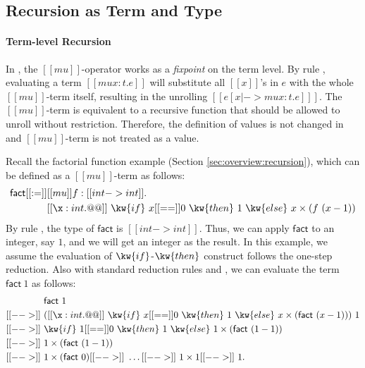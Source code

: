 \subsection{Recursion as Term and Type}
\label{subsec:recur}
\paragraph{Term-level Recursion}

In \name, the $[[mu]]$-operator works as a \emph{fixpoint} on the term
level. By rule , evaluating a term $[[mu x:t.e]]$ will
substitute all $[[x]]$'s in $e$ with the whole $[[mu]]$-term itself,
resulting in the unrolling $[[e [x |-> mu x:t.e] ]]$. The
$[[mu]]$-term is equivalent to a recursive function that should be
allowed to unroll without restriction. Therefore, the definition of
values is not changed in \name and $[[mu]]$-term is not treated as a
value. 

 

Recall the factorial function example (Section
\ref{sec:overview:recursion}), which
can be defined as a $[[mu]]$-term as follows:
\begin{align*}
    \mathsf{fact} [[:=]] &[[mu]] f : [[int -> int]] . \\ &[[\x : int
        . @@]]~\kw{if}~x [[==]]0~\kw{then}~1~\kw{else}~x \times (f~(x
    - 1))
\end{align*}
By rule , the type of $\mathsf{fact}$ is $[[int ->
    int]]$. Thus, we can apply $\mathsf{fact}$ to an integer, say $1$,
and we will get an integer as the result. In this example, we assume
the evaluation of $\kw{if}$-$\kw{then}$ construct follows the one-step
reduction. Also with standard reduction rules  and
, we can evaluate the term $\mathsf{fact}~1$ as
follows:
\begin{align*}
    &\mathsf{fact}~1 \\ [[-->]]~& ([[\x : int . @@]]~\kw{if}~x
  [[==]]0~\kw{then}~1~\kw{else}~x \times (\mathsf{fact}~(x - 1)))~1
  \\ [[-->]]~ & \kw{if}~1 [[==]]0~\kw{then}~1~\kw{else}~1 \times
  (\mathsf{fact}~(1 - 1)) \\ [[-->]]~& 1 \times (\mathsf{fact}~(1-1))
  \\ [[-->]]~& 1 \times (\mathsf{fact}~0) [[-->]]~ \dots [[-->]]~ 1 \times
  1 [[-->]]~ 1. 
\end{align*}

